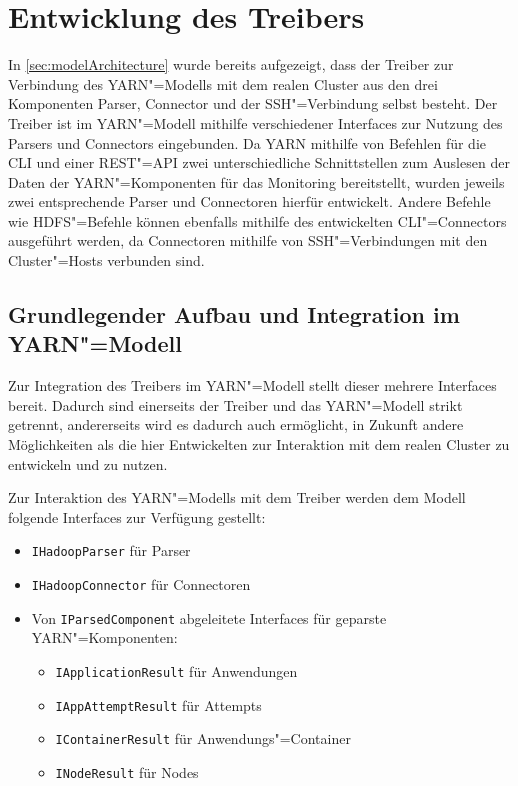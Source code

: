 \section{Entwicklung des Treibers}
\label{sec:sshDriver}

In \cref{sec:modelArchitecture} wurde bereits aufgezeigt, dass der Treiber zur Verbindung des \ac{YARN}"=Modells mit dem realen Cluster aus den drei Komponenten Parser, Connector und der SSH"=Verbindung selbst besteht.
Der Treiber ist im \ac{YARN}"=Modell mithilfe verschiedener Interfaces zur Nutzung des Parsers und Connectors eingebunden.
Da \ac{YARN} mithilfe von Befehlen für die \ac{CLI} und einer REST"=API zwei unterschiedliche Schnittstellen zum Auslesen der Daten der \ac{YARN}"=Komponenten für das Monitoring bereitstellt, wurden jeweils zwei entsprechende Parser und Connectoren hierfür entwickelt.
Andere Befehle wie \zB \ac{HDFS}"=Befehle können ebenfalls mithilfe des entwickelten \ac{CLI}"=Connectors ausgeführt werden, da Connectoren mithilfe von SSH"=Verbindungen mit den Cluster"=Hosts verbunden sind.

\subsection{Grundlegender Aufbau und Integration im \acs{YARN}"=Modell}
\label{subsec:driverModelIntegration}

Zur Integration des Treibers im \ac{YARN}"=Modell stellt dieser mehrere Interfaces bereit.
Dadurch sind einerseits der Treiber und das \ac{YARN}"=Modell strikt getrennt, andererseits wird es dadurch auch ermöglicht, in Zukunft andere Möglichkeiten als die hier Entwickelten zur Interaktion mit dem realen Cluster zu entwickeln und zu nutzen.

Zur Interaktion des \ac{YARN}"=Modells mit dem Treiber werden dem Modell folgende Interfaces zur Verfügung gestellt:

\begin{itemize}
    \item \texttt{IHadoopParser} für Parser
    \item \texttt{IHadoopConnector} für Connectoren
    \item Von \texttt{IParsedComponent} abgeleitete Interfaces für geparste \ac{YARN}"=Komponenten:
    \begin{itemize}
        \item \texttt{IApplicationResult} für Anwendungen
        \item \texttt{IAppAttemptResult} für Attempts
        \item \texttt{IContainerResult} für Anwendungs"=Container
        \item \texttt{INodeResult} für Nodes
    \end{itemize}
\end{itemize}

